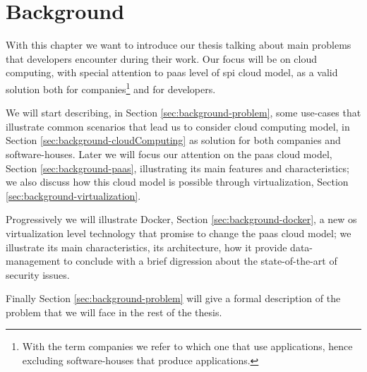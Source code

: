 %
%
\chapter{Background}
\label{cap:background}
With this chapter we want to introduce our thesis talking about main problems that developers
encounter during their work. Our focus will be on cloud computing, with special
attention to \ac{paas} level of \ac{spi} cloud model, as a valid solution both for
companies\footnote{With the term companies we refer to which one that use applications, hence
excluding software-houses that produce applications.} and for developers.

We will start describing, in Section \ref{sec:background-problem}, some use-cases that illustrate
common scenarios that lead us to consider cloud computing model, in Section 
\ref{sec:background-cloudComputing} as solution for both companies and software-houses.
Later we will focus our attention on the \ac{paas} cloud model, Section \ref{sec:background-paas}, 
illustrating its main features and characteristics; we also discuss how this cloud model is possible
through virtualization, Section \ref{sec:background-virtualization}.

Progressively we will illustrate Docker, Section \ref{sec:background-docker}, a new \acs{os}
virtualization level technology that promise to change the \ac{paas} cloud model; we illustrate its
main characteristics, its architecture, how it provide data-management to conclude with a brief digression
about the state-of-the-art of security issues.

Finally Section \ref{sec:background-problem} will give a formal description of the problem that we
will face in the rest of the thesis.











%

%